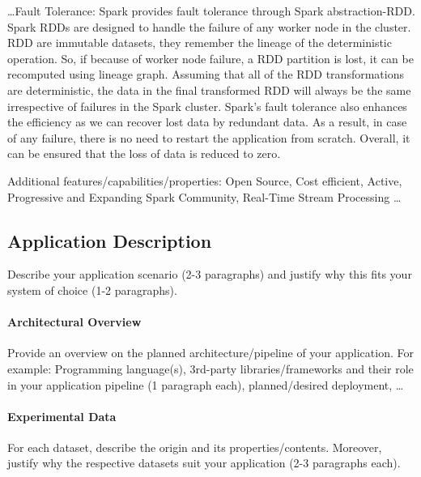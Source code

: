 \begin{packed_enum}
     \item \ldots Fault Tolerance: Spark provides fault tolerance through Spark abstraction-RDD. Spark RDDs are designed to handle the failure of any worker node in the cluster. RDD are immutable datasets, they remember the lineage of the deterministic operation. So, if because of worker node failure, a RDD partition is lost, it can be recomputed using lineage graph. Assuming that all of the RDD transformations are deterministic, the data in the final transformed RDD will always be the same irrespective of failures in the Spark cluster. Spark’s fault tolerance also enhances the efficiency as we can recover lost data by redundant data. As a result, in case of any failure, there is no need to restart the application from scratch. Overall, it can be ensured that the loss of data is reduced to zero.    
    
    \item Additional features/capabilities/properties: Open Source, 
    Cost efficient, 
    Active, Progressive and Expanding Spark Community, 
    Real-Time Stream Processing  \ldots
    
\end{packed_enum}

\subsection{Application Description}
\label{subsec:cp1-application-description}

Describe your application scenario (2-3 paragraphs) and justify why this fits your system of choice (1-2 paragraphs).

\paragraph{Architectural Overview}

Provide an overview on the planned architecture/pipeline of your application. For example: Programming language(s), 3rd-party libraries/frameworks and their role in your application pipeline (1 paragraph each), planned/desired deployment, \ldots

\paragraph{Experimental Data}

For each dataset, describe the origin and its properties/contents. Moreover, justify why the respective datasets suit your application (2-3 paragraphs each).

